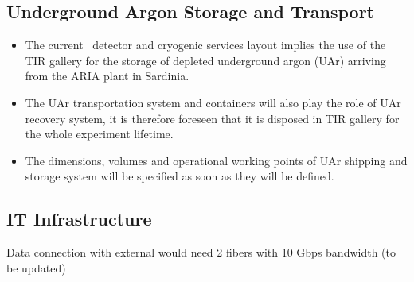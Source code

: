 \subsection{Underground Argon Storage and Transport}
\label{sec:UndegroundArgonStorage}
\begin{itemize}
\item The current \DSks\ detector and cryogenic services layout implies the use of the TIR gallery for the storage of depleted underground argon (UAr) arriving from the ARIA plant in Sardinia.
\item The UAr transportation system and containers will also play the role of UAr recovery system, it is therefore foreseen that it is disposed in TIR gallery for the whole experiment lifetime.
\item The dimensions, volumes and operational working points of UAr shipping and storage system will be specified as soon as they will be defined.
\end{itemize}


\subsection{IT Infrastructure}
\label{sec:ITInfrastructure}

Data connection with external would need 2 fibers with 10 Gbps bandwidth (to be updated)


